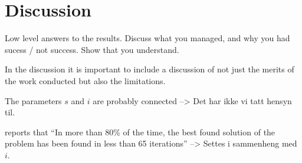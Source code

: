 \section{Discussion}
Low level answers to the results. 
Discuss what you managed, and why you had sucess / not success. 
Show that you understand.

In the discussion it is important to include a discussion of not just the merits of the work conducted but also the limitations. 

The parameters $s$ and $i$ are probably connected --> Det har ikke vi tatt hensyn til. 

\citet{poorzahedy11} reports that ``In more than 80\% of the time, the best found solution of the problem has been found in less than 65 iterations'' --> Settes i sammenheng med $i$.


